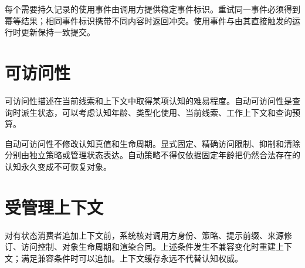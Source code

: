 每个需要持久记录的使用事件由调用方提供稳定事件标识。重试同一事件必须得到幂等结果；相同事件标识携带不同内容时返回冲突。使用事件与由其直接触发的运行时更新保持一致提交。

\section{可访问性}

可访问性描述在当前线索和上下文中取得某项认知的难易程度。自动可访问性是查询时派生状态，可以考虑认知年龄、类型化使用、当前线索、工作上下文和查询预算。

自动可访问性不修改认知真值和生命周期。显式固定、精确访问限制、抑制和清除分别由独立策略或管理状态表达。自动策略不得仅依据固定年龄把仍然合法存在的认知永久变成不可恢复对象。

\section{受管理上下文}

对有状态消费者追加上下文前，系统核对调用方身份、策略、提示前缀、来源修订、访问控制、对象生命周期和渲染合同。上述条件发生不兼容变化时重建上下文；满足兼容条件时可以追加。上下文缓存永远不代替认知权威。

